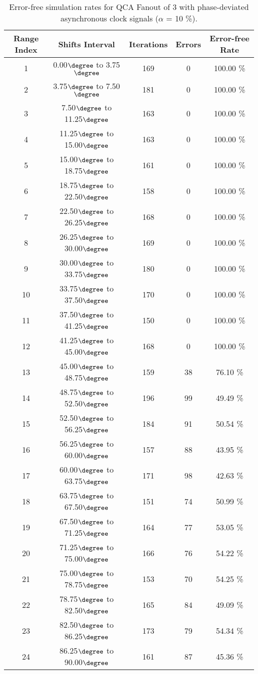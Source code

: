 \flushleft
\begin{table}[h]
\begin{center}
\caption{Error-free simulation rates for QCA Fanout of 3 with phase-deviated asynchronous clock signals ($\alpha$ = 10 \%).}
\begin{tabular}{|c|c|c|c|c|}
\hline
\textbf{Range Index} & \textbf{Shifts Interval} & \textbf{Iterations} & \textbf{Errors} & \textbf{Error-free Rate} \\
\hline
1  &  0.00$\degree$ to  3.75$\degree$ & 169 &  0 & 100.00 \% \\
\hline
2  &  3.75$\degree$ to  7.50$\degree$ & 181 &  0 & 100.00 \% \\
\hline
3  &  7.50$\degree$ to 11.25$\degree$ & 163 &  0 & 100.00 \% \\
\hline
4  & 11.25$\degree$ to 15.00$\degree$ & 163 &  0 & 100.00 \% \\
\hline
5  & 15.00$\degree$ to 18.75$\degree$ & 161 &  0 & 100.00 \% \\
\hline
6  & 18.75$\degree$ to 22.50$\degree$ & 158 &  0 & 100.00 \% \\
\hline
7  & 22.50$\degree$ to 26.25$\degree$ & 168 &  0 & 100.00 \% \\
\hline
8  & 26.25$\degree$ to 30.00$\degree$ & 169 &  0 & 100.00 \% \\
\hline
9  & 30.00$\degree$ to 33.75$\degree$ & 180 &  0 & 100.00 \% \\
\hline
10 & 33.75$\degree$ to 37.50$\degree$ & 170 &  0 & 100.00 \% \\
\hline
11 & 37.50$\degree$ to 41.25$\degree$ & 150 &  0 & 100.00 \% \\
\hline
12 & 41.25$\degree$ to 45.00$\degree$ & 168 &  0 & 100.00 \% \\
\hline
13 & 45.00$\degree$ to 48.75$\degree$ & 159 & 38 &  76.10 \% \\
\hline
14 & 48.75$\degree$ to 52.50$\degree$ & 196 & 99 &  49.49 \% \\
\hline
15 & 52.50$\degree$ to 56.25$\degree$ & 184 & 91 &  50.54 \% \\
\hline
16 & 56.25$\degree$ to 60.00$\degree$ & 157 & 88 &  43.95 \% \\
\hline
17 & 60.00$\degree$ to 63.75$\degree$ & 171 & 98 &  42.63 \% \\
\hline
18 & 63.75$\degree$ to 67.50$\degree$ & 151 & 74 &  50.99 \% \\
\hline
19 & 67.50$\degree$ to 71.25$\degree$ & 164 & 77 &  53.05 \% \\
\hline
20 & 71.25$\degree$ to 75.00$\degree$ & 166 & 76 &  54.22 \% \\
\hline
21 & 75.00$\degree$ to 78.75$\degree$ & 153 & 70 &  54.25 \% \\
\hline
22 & 78.75$\degree$ to 82.50$\degree$ & 165 & 84 &  49.09 \% \\
\hline
23 & 82.50$\degree$ to 86.25$\degree$ & 173 & 79 &  54.34 \% \\
\hline
24 & 86.25$\degree$ to 90.00$\degree$ & 161 & 87 &  45.36 \% \\
\hline


\end{tabular}
\end{center}
\end{table}
